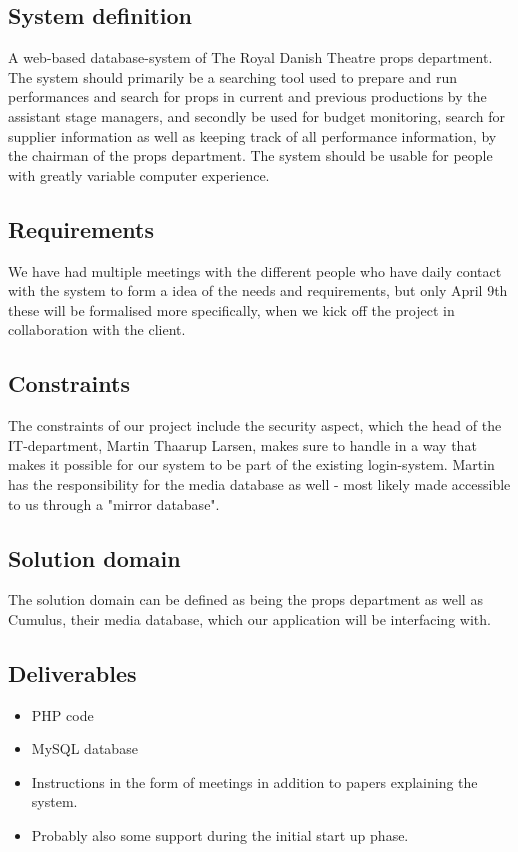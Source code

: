 \documentclass[12pt]{article}
\begin{document}
\subsection{System definition}
A web-based database-system of The Royal Danish Theatre props department. The system should primarily be a searching tool used to prepare and run performances and search for props in current and previous productions by the assistant stage managers, and secondly be used for budget monitoring, search for supplier information as well as keeping track of all performance information, by the chairman of the props department. The system should be usable for people with greatly variable computer experience.
\subsection{Requirements}
We have had multiple meetings with the different people who have daily contact with the system to form a idea of the needs and requirements, but only April 9th these will be formalised more specifically, when we kick off the project in collaboration with the client.
\subsection{Constraints}
The constraints of our project include the security aspect, which the head of the IT-department, Martin Thaarup Larsen, makes sure to handle in a way that makes it possible for our system to be part of the existing login-system. Martin has the responsibility for the media database as well - most likely made accessible to us through a "mirror database".   
\subsection{Solution domain}
The solution domain can be defined as being the props department as well as Cumulus, their media database, which our application will be interfacing with.
\subsection{Deliverables}
\begin{itemize}
  \item PHP code
  \item MySQL database
  \item Instructions in the form of meetings in addition to papers explaining the system.
  \item Probably also some support during the initial start up phase.
\end{itemize}
\end{document}
